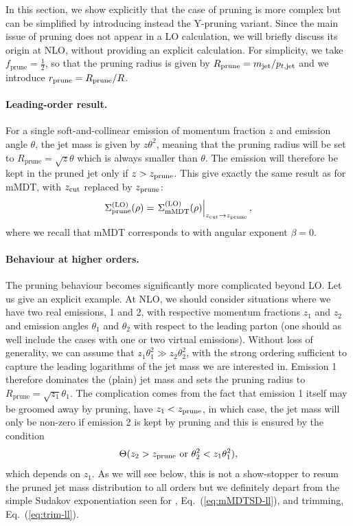 In this section, we show explicitly that the case of pruning is more
complex but can be simplified by introducing instead the
Y-pruning variant. Since the main issue of pruning does not appear
in a LO calculation, we will briefly discuss its origin at NLO,
without providing an explicit calculation.
%
For simplicity, we take $f_{\text{prune}}=\frac{1}{2}$, so that the
pruning radius is given by $R_{\text{prune}}=m_{\text{jet}}/p_{t,\text{jet}}$
and we introduce $r_{\text{prune}}=R_{\text{prune}}/R$.

\paragraph{Leading-order result.} For a single soft-and-collinear
emission of momentum fraction $z$ and emission angle $\theta$, the jet
mass is given by $z\theta^2$, meaning that the pruning radius will be
set to $R_{\text{prune}}=\sqrt{z}\theta$ which is always smaller than
$\theta$. The emission will therefore be kept in the pruned jet only
if $z>z_{\text{prune}}$. This give exactly the same result as for mMDT, with
$z_{\text{cut}}$ replaced by $z_{\text{prune}}$:
\begin{equation}\label{eq:prune-lo-full}
  \Sigma^{\text{(LO)}}_{\text{prune}}(\rho)
   = \left.\Sigma^{\text{(LO)}}_{\text{mMDT}}(\rho)\right|_{z_{\text{cut}}\to z_{\text{prune}}},
\end{equation}
where we recall that mMDT corresponds to \SD with angular exponent $\beta=0$.

\paragraph{Behaviour at higher orders.} The pruning behaviour becomes significantly more complicated beyond LO. Let us give an explicit example. At NLO, we should consider
situations where we have two real emissions, 1 and 2, with respective
momentum fractions $z_1$ and $z_2$ and emission angles $\theta_1$ and
$\theta_2$ with respect to the leading parton (one should as well include the
cases with one or two virtual emissions).
%
Without loss of generality, we can assume that $z_1\theta_1^2\gg
z_2\theta_2^2$, with the strong ordering sufficient to capture the
leading logarithms of the jet mass we are interested in.
%
Emission 1 therefore dominates the (plain) jet mass and sets the
pruning radius to $R_{\text{prune}}=\sqrt{z_1}\theta_1$.
%
The complication comes from the fact that emission 1 itself may be
groomed away by pruning, \ie have $z_1<z_{\text{prune}}$, in which case, the
jet mass will only be non-zero if emission 2 is kept by pruning and
this is ensured by the condition
\[
  \Theta(z_2>z_{\text{prune}}\text{ or }\theta_2^2<z_1\theta_1^2),
\]
which depends on $z_1$. As we will see below, this is not a
show-stopper to resum the pruned jet mass distribution to all orders
but we definitely depart from the simple Sudakov exponentiation seen
for \SD, Eq.~(\ref{eq:mMDTSD-ll}), and trimming,
Eq.~(\ref{eq:trim-ll}).
%


